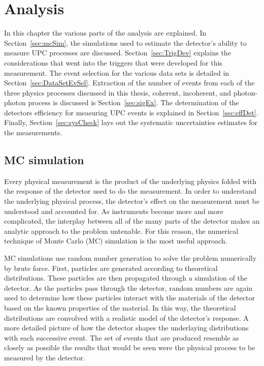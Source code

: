 \chapter{Analysis}
  In this chapter the various parts of the analysis are explained. 
  In Section~\ref{sec:mcSim}, the simulations used to estimate the detector's 
    ability to measure UPC processes are discussed. 
  Section~\ref{sec:TrigDev} explains the considerations that went into the 
    triggers that were developed for this measurement.
  The event selection for the various data sets is detailed in 
    Section~\ref{sec:DataSetEvSel}.
  Extraction of the number of events from each of the three physics processes 
    discussed in this thesis, coherent, incoherent, and photon-photon process
    is discussed is Section~\ref{sec:sigEx}.
  The determination of the detectors efficiency for measuring UPC events is 
    explained in Section~\ref{sec:effDet}.
  Finally, Section~\ref{sec:sysCheck} lays out the systematic uncertainties 
    estimates for the measurements.

  \section{\label{sec:mcSim} MC simulation}
    Every physical measurement is the product of the underlying physics 
      folded with the response of the detector used to do the measurement. 
    In order to understand the underlying physical process, the detector's 
      effect on the measurement must be understood and accounted for. 
    As instruments become more and more complicated, the interplay between all
      of the many parts of the detector makes an analytic approach to the 
      problem untenable.
    For this reason, the numerical technique of Monte Carlo (MC) simulation is
      the most useful approach.

    MC simulations use random number generation to solve the problem 
      numerically by brute force. 
    First, particles are generated according to theoretical distributions.
    These particles are then propagated through a simulation of the detector.
    As the particles pass through the detector, random numbers are again used
      to determine how these particles interact with the materials of the 
      detector based on the known properties of the material. 
    In this way, the theoretical distributions are convolved with a realistic 
      model of the detector's response. 
    A more detailed picture of how the detector shapes the underlaying 
      distributions with each successive event. 
    The set of events that are produced resemble as closely as possible the 
      results that would be seen were the physical process to be measured 
      by the detector.
    
